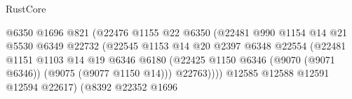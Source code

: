 \begin{lexlean}{RustCore}
\begin{coremodule}
                                                  @6350
                                                  @1696
                                                  @821
                                                  (@22476
                                                    @1155
                                                    @22
                                                    @6350
                                                    (@22481
                                                      @990
                                                      @1154
                                                      @14
                                                      @21
                                                      @5530
                                                      @6349
                                                      @22732
                                                      (@22545
                                                        @1153
                                                        @14
                                                        @20
                                                        @2397
                                                        @6348
                                                        @22554
                                                        (@22481
                                                          @1151
                                                          @1103
                                                          @14
                                                          @19
                                                          @6346
                                                          @6180
                                                          (@22425
                                                            @1150
                                                            @6346
                                                            (@9070 (@9071 @6346))
                                                            (@9075 (@9077 @1150 @14)))
                                                          @22763))))
                                                  @12585
                                                  @12588
                                                  @12591
                                                  @12594
                                                  @22617)
                                                (@8392
                                                  @22352
                                                  @1696

\end{coremodule}
\end{lexlean}
